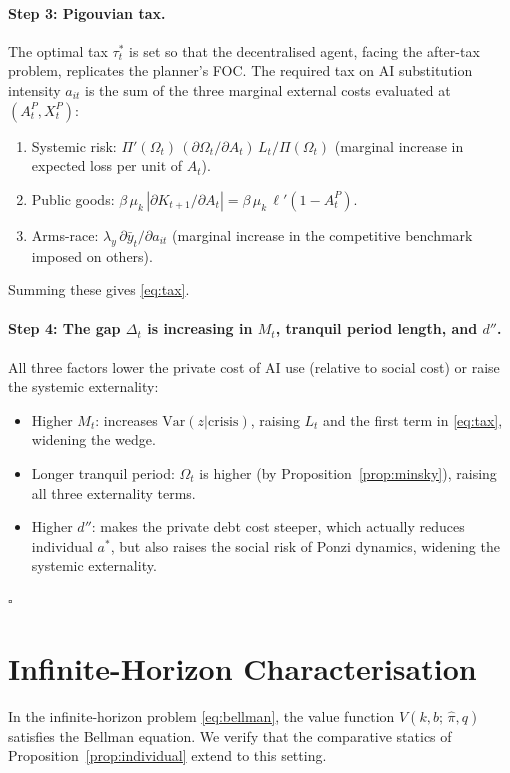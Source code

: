 \documentclass[12pt]{article}
\newcommand{\hpi}{\hat{\pi}}
\begin{document}
\paragraph{Step 3: Pigouvian tax.}
The optimal tax $\tau_t^*$ is set so that the decentralised agent, facing the
after-tax problem, replicates the planner's FOC. The required tax on AI substitution
intensity $a_{it}$ is the sum of the three marginal external costs evaluated at
$(A_t^P, X_t^P)$:
\begin{enumerate}
\item Systemic risk: $\Pi'(\Omega_t)\,(\partial \Omega_t/\partial A_t)\,L_t/\Pi(\Omega_t)$
(marginal increase in expected loss per unit of $A_t$).
\item Public goods: $\beta\,\mu_k\,|\partial K_{t+1}/\partial A_t| = \beta\,\mu_k\,\ell'(1-A_t^P)$.
\item Arms-race: $\lambda_y\,\partial \bar{y}_t/\partial a_{it}$ (marginal increase
in the competitive benchmark imposed on others).
\end{enumerate}
Summing these gives \eqref{eq:tax}.

\paragraph{Step 4: The gap $\Delta_t$ is increasing in $M_t$, tranquil period length, and $d''$.}
All three factors lower the private cost of AI use (relative to social cost) or
raise the systemic externality:
\begin{itemize}
\item Higher $M_t$: increases $\text{Var}(z|\text{crisis})$, raising $L_t$ and the
first term in \eqref{eq:tax}, widening the wedge.
\item Longer tranquil period: $\Omega_t$ is higher (by Proposition~\ref{prop:minsky}),
raising all three externality terms.
\item Higher $d''$: makes the private debt cost steeper, which actually reduces
individual $a^*$, but also raises the social risk of Ponzi dynamics, widening the
systemic externality.
\end{itemize}
$\square$

\section{Infinite-Horizon Characterisation}
\label{app:infinite}

In the infinite-horizon problem \eqref{eq:bellman}, the value function $V(k, b;\,\hpi, q)$
satisfies the Bellman equation. We verify that the comparative statics of
Proposition~\ref{prop:individual} extend to this setting.
\end{document}
